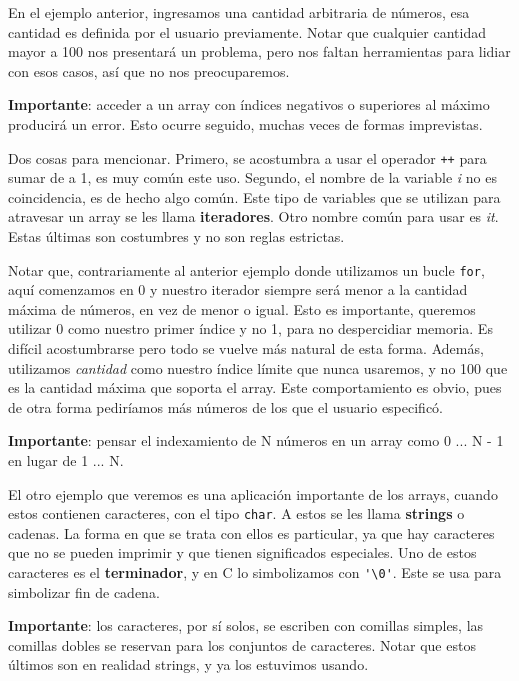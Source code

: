 \documentclass[10pt]{article}
\newcommand{\cfor}[0]{\lstinline{for}}
\begin{document}
En el ejemplo anterior, ingresamos una cantidad arbitraria de números, esa cantidad es definida por el usuario previamente. Notar que cualquier cantidad mayor a 100 nos presentará un problema, pero nos faltan herramientas para lidiar con esos casos, así que no nos preocuparemos.

\bigskip

\textbf{Importante}: acceder a un array con índices negativos o superiores al máximo producirá un error. Esto ocurre seguido, muchas veces de formas imprevistas.

\bigskip

Dos cosas para mencionar. Primero, se acostumbra a usar el operador \lstinline{++} para sumar de a 1, es muy común este uso. Segundo, el nombre de la variable \textit{i} no es coincidencia, es de hecho algo común. Este tipo de variables que se utilizan para atravesar un array se les llama \textbf{iteradores}. Otro nombre común para usar es \textit{it}. Estas últimas son costumbres y no son reglas estrictas.

\bigskip

Notar que, contrariamente al anterior ejemplo donde utilizamos un bucle \cfor, aquí comenzamos en 0 y nuestro iterador siempre será menor a la cantidad máxima de números, en vez de menor o igual. Esto es importante, queremos utilizar 0 como nuestro primer índice y no 1, para no despercidiar memoria. Es difícil acostumbrarse pero todo se vuelve más natural de esta forma. Además, utilizamos \textit{cantidad} como nuestro índice límite que nunca usaremos, y no 100 que es la cantidad máxima que soporta el array. Este comportamiento es obvio, pues de otra forma pediríamos más números de los que el usuario especificó.

\bigskip

\textbf{Importante}: pensar el indexamiento de N números en un array como 0 ... N - 1 en lugar de 1 ... N.

\bigskip

El otro ejemplo que veremos es una aplicación importante de los arrays, cuando estos contienen caracteres, con el tipo \lstinline{char}. A estos se les llama \textbf{strings} o cadenas. La forma en que se trata con ellos es particular, ya que hay caracteres que no se pueden imprimir y que tienen significados especiales. Uno de estos caracteres es el \textbf{terminador}, y en C lo simbolizamos con \lstinline{'\0'}. Este se usa para simbolizar fin de cadena.

\bigskip

\textbf{Importante}: los caracteres, por sí solos, se escriben con comillas simples, las comillas dobles se reservan para los conjuntos de caracteres. Notar que estos últimos son en realidad strings, y ya los estuvimos usando.
\end{document}
